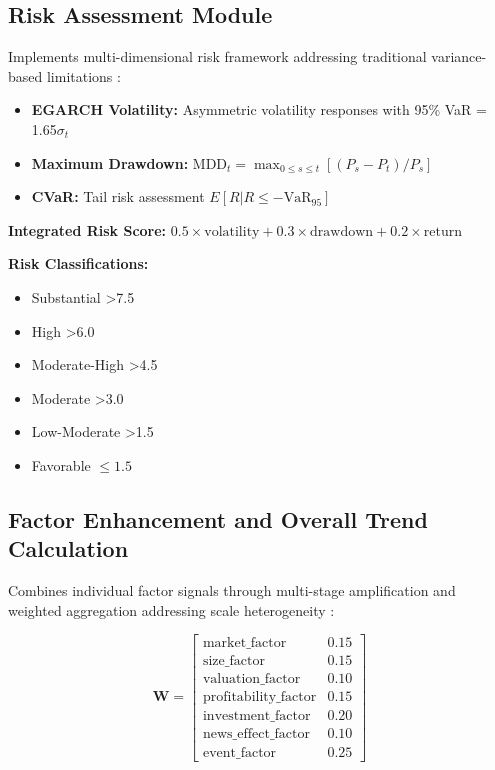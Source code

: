 \documentclass[3p,times,procedia]{elsarticle}
\begin{document}
\subsection{{Risk Assessment Module}}

Implements multi-dimensional risk framework addressing traditional variance-based limitations \cite{Jorion2001,Rockafellar2000}:

\begin{itemize}
\item \textbf{EGARCH Volatility:} Asymmetric volatility responses with 95\% VaR = 1.65$\sigma_t$

\item \textbf{Maximum Drawdown:} $\text{MDD}_t = \max_{0 \leq s \leq t} [(P_s - P_t)/P_s]$

\item \textbf{CVaR:} Tail risk assessment $E[R | R \leq -\text{VaR}_{95}]$
\end{itemize}

\textbf{Integrated Risk Score:} $0.5 \times \text{volatility} + 0.3 \times \text{drawdown} + 0.2 \times \text{return}$

\textbf{Risk Classifications:}
\begin{itemize}
\item Substantial >7.5
\item High >6.0  
\item Moderate-High >4.5
\item Moderate >3.0
\item Low-Moderate >1.5
\item Favorable $\leq 1.5$
\end{itemize}

\subsection{{Factor Enhancement and Overall Trend Calculation}}

Combines individual factor signals through multi-stage amplification and weighted aggregation addressing scale heterogeneity \cite{Harvey2016,FAMA1993}:

\begin{equation}
\textbf{W} = 
\begin{bmatrix} 
\text{market\_factor} & 0.15 \\ 
\text{size\_factor} & 0.15 \\ 
\text{valuation\_factor} & 0.10 \\ 
\text{profitability\_factor} & 0.15 \\ 
\text{investment\_factor} & 0.20 \\ 
\text{news\_effect\_factor} & 0.10 \\ 
\text{event\_factor} & 0.25
\end{bmatrix}
\end{equation}
\end{document}
